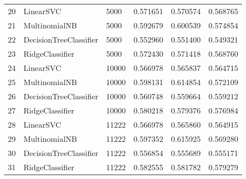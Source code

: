 \begin{tabular}{lllrrr}
20 &               LinearSVC &         5000 &  0.571651 &   0.570574 &  0.568765 \\
21 &           MultinomialNB &         5000 &  0.592679 &   0.600539 &  0.574854 \\
22 &  DecisionTreeClassifier &         5000 &  0.552960 &   0.551400 &  0.549321 \\
23 &         RidgeClassifier &         5000 &  0.572430 &   0.571418 &  0.568760 \\
24 &               LinearSVC &        10000 &  0.566978 &   0.565837 &  0.564715 \\
25 &           MultinomialNB &        10000 &  0.598131 &   0.614854 &  0.572109 \\
26 &  DecisionTreeClassifier &        10000 &  0.560748 &   0.559664 &  0.559212 \\
27 &         RidgeClassifier &        10000 &  0.580218 &   0.579376 &  0.576984 \\
28 &               LinearSVC &        11222 &  0.566978 &   0.565860 &  0.564915 \\
29 &           MultinomialNB &        11222 &  0.597352 &   0.615925 &  0.569280 \\
30 &  DecisionTreeClassifier &        11222 &  0.556854 &   0.555689 &  0.555171 \\
31 &         RidgeClassifier &        11222 &  0.582555 &   0.581782 &  0.579279 \\
\bottomrule
\end{tabular}

